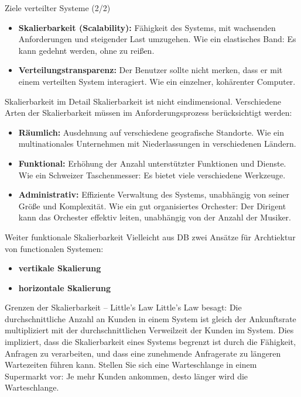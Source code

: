 \documentclass{beamer}
\begin{document}
\begin{frame}{Ziele verteilter Systeme (2/2)}
    \begin{itemize}
        \item \textbf{Skalierbarkeit (Scalability):}  Fähigkeit des Systems, mit wachsenden Anforderungen und steigender Last umzugehen.  Wie ein elastisches Band: Es kann gedehnt werden, ohne zu reißen.
        \item \textbf{Verteilungstransparenz:}  Der Benutzer sollte nicht merken, dass er mit einem verteilten System interagiert.  Wie ein einzelner, kohärenter Computer.
    \end{itemize}
\end{frame}


\begin{frame}{Skalierbarkeit im Detail}
    Skalierbarkeit ist nicht eindimensional.  Verschiedene Arten der Skalierbarkeit müssen im Anforderungsprozess berücksichtigt werden:

    \begin{itemize}
        \item \textbf{Räumlich:}  Ausdehnung auf verschiedene geografische Standorte.  Wie ein multinationales Unternehmen mit Niederlassungen in verschiedenen Ländern.
        \item \textbf{Funktional:}  Erhöhung der Anzahl unterstützter Funktionen und Dienste. Wie ein Schweizer Taschenmesser: Es bietet viele verschiedene Werkzeuge.
        \item \textbf{Administrativ:}  Effiziente Verwaltung des Systems, unabhängig von seiner Größe und Komplexität. Wie ein gut organisiertes Orchester:  Der Dirigent kann das Orchester effektiv leiten, unabhängig von der Anzahl der Musiker.
    \end{itemize}
\end{frame}

\begin{frame}{Weiter funktionale Skalierbarkeit}
    Vielleicht aus DB zwei Ansätze für Archtiektur von functionalen Systemen:
    \begin{itemize}
    \item \textbf{vertikale Skalierung}
    \item \textbf{horizontale Skalierung}
    \end{itemize}
\end{frame}

\begin{frame}{Grenzen der Skalierbarkeit -- Little's Law}
    Little's Law besagt: Die durchschnittliche Anzahl an Kunden in einem System ist gleich der Ankunftsrate multipliziert mit der durchschnittlichen Verweilzeit der Kunden im System.  Dies impliziert, dass die Skalierbarkeit eines Systems begrenzt ist durch die Fähigkeit, Anfragen zu verarbeiten, und dass eine zunehmende Anfragerate zu längeren Wartezeiten führen kann.  Stellen Sie sich eine Warteschlange in einem Supermarkt vor: Je mehr Kunden ankommen, desto länger wird die Warteschlange.
\end{frame}
\end{document}
